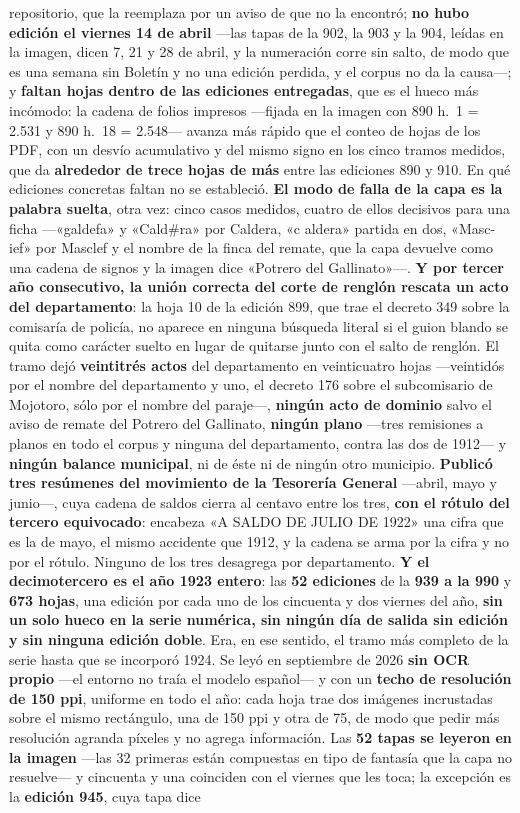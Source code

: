 repositorio, que la reemplaza por un aviso de que no la encontró; \textbf{no hubo edición el viernes 14 de abril} ---las tapas de la 902, la 903 y la 904, leídas en la imagen, dicen 7, 21 y 28 de abril, y la numeración corre sin salto, de modo que es una semana sin Boletín y no una edición perdida, y el corpus no da la causa---; y \textbf{faltan hojas dentro de las ediciones entregadas}, que es el hueco más incómodo: la cadena de folios impresos ---fijada en la imagen con 890 h.\ 1 = 2.531 y 890 h.\ 18 = 2.548--- avanza más rápido que el conteo de hojas de los PDF, con un desvío acumulativo y del mismo signo en los cinco tramos medidos, que da \textbf{alrededor de trece hojas de más} entre las ediciones 890 y 910. En qué ediciones concretas faltan no se estableció. \textbf{El modo de falla de la capa es la palabra suelta}, otra vez: cinco casos medidos, cuatro de ellos decisivos para una ficha ---«galdefa» y «Cald\#ra» por Caldera, «c aldera» partida en dos, «Masc-ief» por Masclef y el nombre de la finca del remate, que la capa devuelve como una cadena de signos y la imagen dice «Potrero del Gallinato»---. \textbf{Y por tercer año consecutivo, la unión correcta del corte de renglón rescata un acto del departamento}: la hoja 10 de la edición 899, que trae el decreto 349 sobre la comisaría de policía, no aparece en ninguna búsqueda literal si el guion blando se quita como carácter suelto en lugar de quitarse junto con el salto de renglón. El tramo dejó \textbf{veintitrés actos} del departamento en veinticuatro hojas ---veintidós por el nombre del departamento y uno, el decreto 176 sobre el subcomisario de Mojotoro, sólo por el nombre del paraje---, \textbf{ningún acto de dominio} salvo el aviso de remate del Potrero del Gallinato, \textbf{ningún plano} ---tres remisiones a planos en todo el corpus y ninguna del departamento, contra las dos de 1912--- y \textbf{ningún balance municipal}, ni de éste ni de ningún otro municipio. \textbf{Publicó tres resúmenes del movimiento de la Tesorería General} ---abril, mayo y junio---, cuya cadena de saldos cierra al centavo entre los tres, \textbf{con el rótulo del tercero equivocado}: encabeza «A SALDO DE JULIO DE 1922» una cifra que es la de mayo, el mismo accidente que 1912, y la cadena se arma por la cifra y no por el rótulo. Ninguno de los tres desagrega por departamento. \textbf{Y el decimotercero es el año 1923 entero}: las \textbf{52 ediciones} de la \textbf{939 a la 990} y \textbf{673 hojas}, una edición por cada uno de los cincuenta y dos viernes del año, \textbf{sin un solo hueco en la serie numérica, sin ningún día de salida sin edición y sin ninguna edición doble}. Era, en ese sentido, el tramo más completo de la serie hasta que se incorporó 1924. Se leyó en septiembre de 2026 \textbf{sin OCR propio} ---el entorno no traía el modelo español--- y con un \textbf{techo de resolución de 150 ppi}, uniforme en todo el año: cada hoja trae dos imágenes incrustadas sobre el mismo rectángulo, una de 150 ppi y otra de 75, de modo que pedir más resolución agranda píxeles y no agrega información. Las \textbf{52 tapas se leyeron en la imagen} ---las 32 primeras están compuestas en tipo de fantasía que la capa no resuelve--- y cincuenta y una coinciden con el viernes que les toca; la excepción es la \textbf{edición 945}, cuya tapa dice 